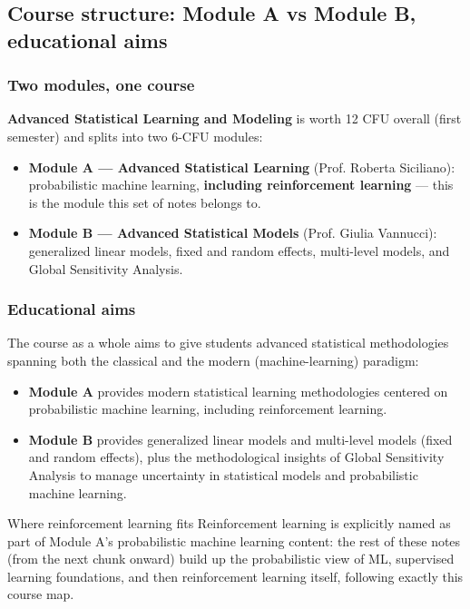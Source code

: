 \subsection{Course structure: Module A vs Module B, educational aims}\label{sec:prolusion-structure}

\subsubsection{Two modules, one course}

\textbf{Advanced Statistical Learning and Modeling} is worth 12 CFU overall (first semester) and splits into two 6-CFU modules:

\begin{itemize}
  \item \textbf{Module A --- Advanced Statistical Learning} (Prof. Roberta Siciliano): probabilistic machine learning, \textbf{including reinforcement learning} --- this is the module this set of notes belongs to.
  \item \textbf{Module B --- Advanced Statistical Models} (Prof. Giulia Vannucci): generalized linear models, fixed and random effects, multi-level models, and Global Sensitivity Analysis.
\end{itemize}

\subsubsection{Educational aims}

The course as a whole aims to give students advanced statistical methodologies spanning both the classical and the modern (machine-learning) paradigm:
\begin{itemize}
  \item \textbf{Module A} provides modern statistical learning methodologies centered on probabilistic machine learning, including reinforcement learning.
  \item \textbf{Module B} provides generalized linear models and multi-level models (fixed and random effects), plus the methodological insights of Global Sensitivity Analysis to manage uncertainty in statistical models and probabilistic machine learning.
\end{itemize}

\begin{noteboxtitle}{Where reinforcement learning fits}
Reinforcement learning is explicitly named as part of Module A's probabilistic machine learning content: the rest of these notes (from the next chunk onward) build up the probabilistic view of ML, supervised learning foundations, and then reinforcement learning itself, following exactly this course map.
\end{noteboxtitle}

